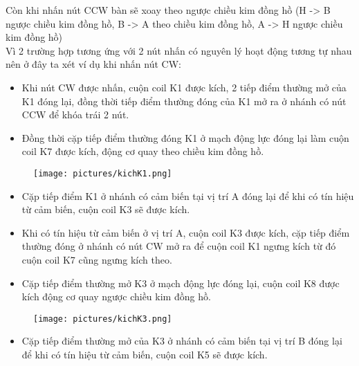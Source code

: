 Còn khi nhấn nút CCW bàn sẽ xoay theo ngược chiều kim đồng hồ (H -> B ngược chiều kim đồng hồ, B -> A theo chiều kim đồng hồ, A -> H ngược chiều kim đồng hồ)\\

Vì 2 trường hợp tương ứng với 2 nút nhấn có nguyên lý hoạt động tương tự nhau nên ở đây ta xét ví dụ khi nhấn nút CW:
\begin{itemize}
    \item Khi nút CW được nhấn, cuộn coil K1 được kích, 2 tiếp điểm thường mở của K1 đóng lại, đồng thời tiếp điểm thường đóng của K1 mở ra ở nhánh có nút CCW để khóa trái 2 nút.
\end{itemize}
\begin{figure}[H]
    \centering
\end{figure}
\begin{itemize}
    \item Đồng thời cặp tiếp điểm thường đóng K1 ở mạch động lực đóng lại làm cuộn coil K7 được kích, động cơ quay theo chiều kim đồng hồ.
\end{itemize}
\begin{figure}[H]
    \centering
    \texttt{[image: pictures/kichK1.png]}
\end{figure}
\begin{itemize}
    \item Cặp tiếp điểm K1 ở nhánh có cảm biến tại vị trí A đóng lại để khi có tín hiệu từ cảm biến, cuộn coil K3 sẽ được kích.
\end{itemize}
\begin{figure}[H]
    \centering
\end{figure}
\begin{itemize}
    \item Khi có tín hiệu từ cảm biến ở vị trí A, cuộn coil K3 được kích, cặp tiếp điểm thường đóng ở nhánh có nút CW mở ra để cuộn coil K1 ngưng kích từ đó cuộn coil K7 cũng ngưng kích theo.
    \item Cặp tiếp điểm thường mở K3 ở mạch động lực đóng lại, cuộn coil K8 được kích động cơ quay ngược chiều kim đồng hồ. 
\end{itemize}
\begin{figure}[H]
    \centering
    \texttt{[image: pictures/kichK3.png]}
\end{figure}
\begin{itemize}
    \item Cặp tiếp điểm thường mở của K3 ở nhánh có cảm biến tại vị trí B đóng lại để khi có tín hiệu từ cảm biến, cuộn coil K5 sẽ được kích.
\end{itemize}
